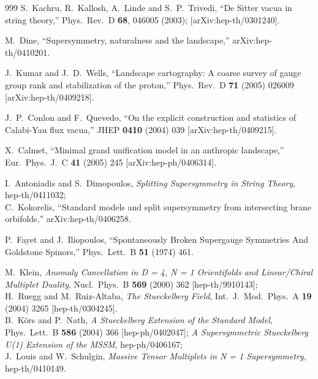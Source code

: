 \begin{thebibliography}{999}
S.~Kachru, R.~Kallosh, A.~Linde and S.~P.~Trivedi,
``De Sitter vacua in string theory,''
Phys.\ Rev.\ D {\bf 68}, 046005 (2003);
[arXiv:hep-th/0301240].

  M.~Dine,
  ``Supersymmetry, naturalness and the landscape,''
  arXiv:hep-th/0410201.

  J.~Kumar and J.~D.~Wells,
  ``Landscape cartography: A coarse survey of gauge group rank and
  stabilization of the proton,''
  Phys.\ Rev.\ D {\bf 71} (2005) 026009
  [arXiv:hep-th/0409218].

  J.~P.~Conlon and F.~Quevedo,
  ``On the explicit construction and statistics of Calabi-Yau flux vacua,''
  JHEP {\bf 0410} (2004) 039
  [arXiv:hep-th/0409215].

  X.~Calmet,
  ``Minimal grand unification model in an anthropic landscape,''
  Eur.\ Phys.\ J.\ C {\bf 41} (2005) 245
  [arXiv:hep-ph/0406314].

I.~Antoniadis and S.~Dimopoulos,
{\it Splitting Supersymmetry in String Theory},
hep-th/0411032;
\\
C.~Kokorelis,
  ``Standard models and split supersymmetry from intersecting brane
  orbifolds,''
  arXiv:hep-th/0406258.

  P.~Fayet and J.~Iliopoulos,
  ``Spontaneously Broken Supergauge Symmetries And Goldstone Spinors,''
  Phys.\ Lett.\ B {\bf 51} (1974) 461.

M.~Klein,
{\it Anomaly Cancellation in D = 4, N = 1 Orientifolds and Linear/Chiral
Multiplet Duality},
Nucl.\ Phys.\ B {\bf 569} (2000) 362 
[hep-th/9910143];
\\
H.~Ruegg and M.~Ruiz-Altaba,
{\it The Stueckelberg Field},
Int.\ J.\ Mod.\ Phys.\ A {\bf 19} (2004) 3265
[hep-th/0304245].
\\
B.~K\"ors and P.~Nath,
{\it A Stueckelberg Extension of the Standard Model},
Phys.\ Lett.\ B {\bf 586} (2004) 366
[hep-ph/0402047];
{\it A Supersymmetric Stueckelberg U(1) Extension of the MSSM},
hep-ph/0406167;
\\
J.~Louis and W.~Schulgin,
{\it Massive Tensor Multiplets in N = 1 Supersymmetry},
hep-th/0410149.


\end{thebibliography}
